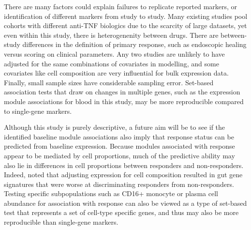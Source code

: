 \begin{outline}
There are many factors could explain failures to replicate reported markers, or identification of different markers from study to study.
Many existing studies pool cohorts with different anti-\gls{TNF} biologics due to the scarcity of large datasets,
yet even within this study, there is heterogenenity between drugs.
There are between-study differences in the definition of primary response,
such as endoscopic healing\autocite{gaujoux2019CellcentredMetaanalysisReveals} versus scoring on clinical parameters\autocite{verstockt2019LowTREM1Expression}.
Any two studies are unlikely to have adjusted for the same combinations of covariates in modelling,
and some covariates like cell composition are very influential for bulk expression data.
Finally, small sample sizes have considerable sampling error.
Set-based association tests that draw on changes in multiple genes,
such as the expression module associations for blood in this study,
may be more reproducible compared to single-gene markers. 

Although this study is purely descriptive, a future aim will be to see if the identified baseline module associations also imply that response status can be predicted from baseline expression.
Because modules associated with response appear to be mediated by cell proportions,
much of the predictive ability may also lie in differences in cell proportions between responders and non-responders.
Indeed, \textcite{gaujoux2019CellcentredMetaanalysisReveals} noted that adjusting expression for cell composition resulted in gut gene signatures that were worse at discriminating responders from non-responders.
Testing specific subpopulations such as CD16+ monocyte or plasma cell abundance for association with response
can also be viewed as a type of set-based test that represents a set of cell-type specific genes,
and thus may also be more reproducible than single-gene markers.


\end{outline}
